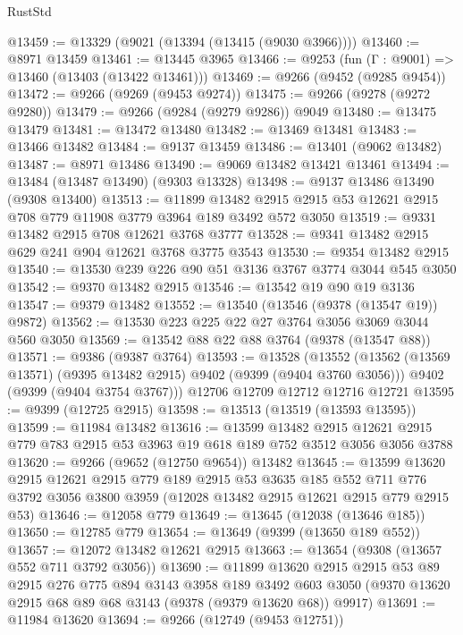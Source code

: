 \begin{lexlean}{RustStd}
\begin{coremodule}
@13459 := @13329 (@9021 (@13394 (@13415 (@9030 @3966))))
@13460 := @8971 @13459
@13461 := @13445 @3965
@13466 := @9253 (fun (Γ : @9001) => @13460 (@13403 (@13422 @13461)))
@13469 := @9266 (@9452 (@9285 @9454))
@13472 := @9266 (@9269 (@9453 @9274))
@13475 := @9266 (@9278 (@9272 @9280))
@13479 := @9266 (@9284 (@9279 @9286)) @9049
@13480 := @13475 @13479
@13481 := @13472 @13480
@13482 := @13469 @13481
@13483 := @13466 @13482
@13484 := @9137 @13459
@13486 := @13401 (@9062 @13482)
@13487 := @8971 @13486
@13490 := @9069 @13482 @13421 @13461
@13494 := @13484 (@13487 @13490) (@9303 @13328)
@13498 := @9137 @13486 @13490 (@9308 @13400)
@13513 := @11899
    @13482
    @2915
    @2915
    @53
    @12621
    @2915
    @708
    @779
    @11908
    @3779
    @3964
    @189
    @3492
    @572
    @3050
@13519 := @9331 @13482 @2915 @708 @12621 @3768 @3777
@13528 := @9341 @13482 @2915 @629 @241 @904 @12621 @3768 @3775 @3543
@13530 := @9354 @13482 @2915
@13540 := @13530 @239 @226 @90 @51 @3136 @3767 @3774 @3044 @545 @3050
@13542 := @9370 @13482 @2915
@13546 := @13542 @19 @90 @19 @3136
@13547 := @9379 @13482
@13552 := @13540 (@13546 (@9378 (@13547 @19)) @9872)
@13562 := @13530 @223 @225 @22 @27 @3764 @3056 @3069 @3044 @560 @3050
@13569 := @13542 @88 @22 @88 @3764 (@9378 (@13547 @88))
@13571 := @9386 (@9387 @3764)
@13593 := @13528
    (@13552
      (@13562 (@13569 @13571) (@9395 @13482 @2915) @9402 (@9399 (@9404 @3760 @3056)))
      @9402
      (@9399 (@9404 @3754 @3767)))
    @12706
    @12709
    @12712
    @12716
    @12721
@13595 := @9399 (@12725 @2915)
@13598 := @13513 (@13519 (@13593 @13595))
@13599 := @11984 @13482
@13616 := @13599
    @13482
    @2915
    @12621
    @2915
    @779
    @783
    @2915
    @53
    @3963
    @19
    @618
    @189
    @752
    @3512
    @3056
    @3056
    @3788
@13620 := @9266 (@9652 (@12750 @9654)) @13482
@13645 := @13599
    @13620
    @2915
    @12621
    @2915
    @779
    @189
    @2915
    @53
    @3635
    @185
    @552
    @711
    @776
    @3792
    @3056
    @3800
    @3959
    (@12028 @13482 @2915 @12621 @2915 @779 @2915 @53)
@13646 := @12058 @779
@13649 := @13645 (@12038 (@13646 @185))
@13650 := @12785 @779
@13654 := @13649 (@9399 (@13650 @189 @552))
@13657 := @12072 @13482 @12621 @2915
@13663 := @13654 (@9308 (@13657 @552 @711 @3792 @3056))
@13690 := @11899
    @13620
    @2915
    @2915
    @53
    @89
    @2915
    @276
    @775
    @894
    @3143
    @3958
    @189
    @3492
    @603
    @3050
    (@9370 @13620 @2915 @68 @89 @68 @3143 (@9378 (@9379 @13620 @68)) @9917)
@13691 := @11984 @13620
@13694 := @9266 (@12749 (@9453 @12751))

\end{coremodule}
\end{lexlean}
